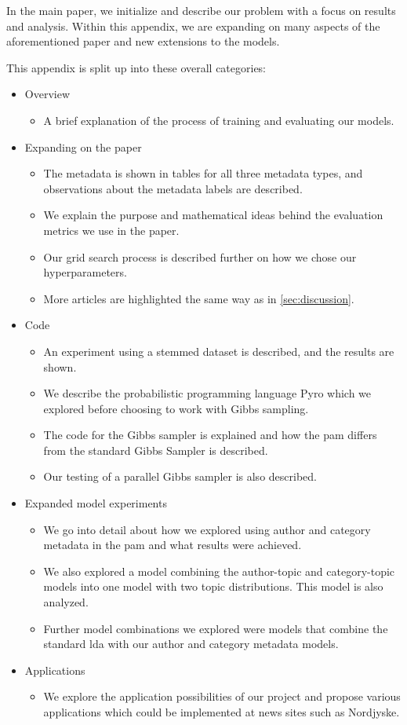 In the main paper, we initialize and describe our problem with a focus on results and analysis. 
Within this appendix, we are expanding on many aspects of the aforementioned paper and new extensions to the models.

This appendix is split up into these overall categories:
\begin{itemize}
	\item Overview
	\begin{itemize}
		\item A brief explanation of the process of training and evaluating our models.
	\end{itemize}
	\item Expanding on the paper
	\begin{itemize}
		\item The metadata is shown in tables for all three metadata types, and observations about the metadata labels are described.
		\item We explain the purpose and mathematical ideas behind the evaluation metrics we use in the paper.
		\item Our grid search process is described further on how we chose our hyperparameters.
		\item More articles are highlighted the same way as in \autoref{sec:discussion}.
	\end{itemize}
	\item Code
	\begin{itemize}
		\item An experiment using a stemmed dataset is described, and the results are shown.
		\item We describe the probabilistic programming language Pyro which we explored before choosing to work with Gibbs sampling.
		\item The code for the Gibbs sampler is explained and how the \gls{pam} differs from the standard Gibbs Sampler is described. 
		\item Our testing of a parallel Gibbs sampler is also described.
	\end{itemize}
	\item Expanded model experiments
	\begin{itemize}
		\item We go into detail about how we explored using author and category metadata in the \gls{pam} and what results were achieved.
		\item We also explored a model combining the author-topic and category-topic models into one model with two topic distributions. This model is also analyzed.
		\item Further model combinations we explored were models that combine the standard \gls{lda} with our author and category metadata models.
	\end{itemize}
	\item Applications
	\begin{itemize}
		\item We explore the application possibilities of our project and propose various applications which could be implemented at news sites such as Nordjyske.
	\end{itemize}
\end{itemize}
